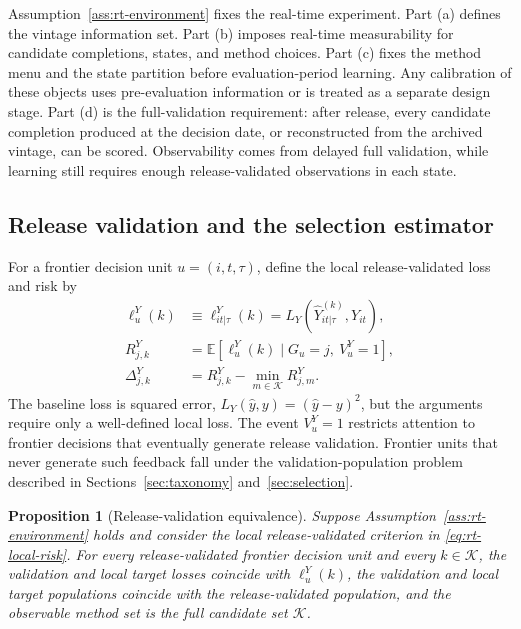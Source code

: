 \documentclass[a4paper, 12pt]{article}
\theoremstyle{plain}
\newtheorem{proposition}{Proposition}
\theoremstyle{remark}
\newcommand{\E}{\mathbb{E}}
\newcommand{\Kcal}{\mathcal{K}}
\newcommand{\1}{\mathbf{1}}
\begin{document}
Assumption~\ref{ass:rt-environment} fixes the real-time experiment. Part (a) defines the vintage information set. Part (b) imposes real-time measurability for candidate completions, states, and method choices. Part (c) fixes the method menu and the state partition before evaluation-period learning. Any calibration of these objects uses pre-evaluation information or is treated as a separate design stage. Part (d) is the full-validation requirement: after release, every candidate completion produced at the decision date, or reconstructed from the archived vintage, can be scored. Observability comes from delayed full validation, while learning still requires enough release-validated observations in each state.

\subsection{Release validation and the selection estimator}

For a frontier decision unit \(u=(i,t,\tau)\), define the local release-validated loss and risk by
\begin{equation}
\label{eq:rt-local-risk}
\begin{aligned}
    \ell^Y_u(k)&\equiv \ell^Y_{it|\tau}(k)
    =L_Y\!\left(\widehat Y^{(k)}_{it|\tau},Y_{it}\right),
    \\
    R^Y_{j,k}&=\E\!\left[\ell^Y_u(k)\mid G_u=j,\ V^Y_u=1\right],
    \\
    \Delta^Y_{j,k}&=R^Y_{j,k}-\min_{m\in\Kcal}R^Y_{j,m} .
\end{aligned}
\end{equation}
The baseline loss is squared error, \(L_Y(\widehat y,y)=(\widehat y-y)^2\), but the arguments require only a well-defined local loss. The event \(V^Y_u=1\) restricts attention to frontier decisions that eventually generate release validation. Frontier units that never generate such feedback fall under the validation-population problem described in Sections~\ref{sec:taxonomy} and~\ref{sec:selection}.

\begin{proposition}[Release-validation equivalence]
\label{prop:rt-release-alignment}
Suppose Assumption~\ref{ass:rt-environment} holds and consider the local release-validated criterion in \eqref{eq:rt-local-risk}. For every release-validated frontier decision unit and every \(k\in\Kcal\), the validation and local target losses coincide with \(\ell^Y_u(k)\), the validation and local target populations coincide with the release-validated population, and the observable method set is the full candidate set \(\Kcal\).
\end{proposition}
\end{document}
